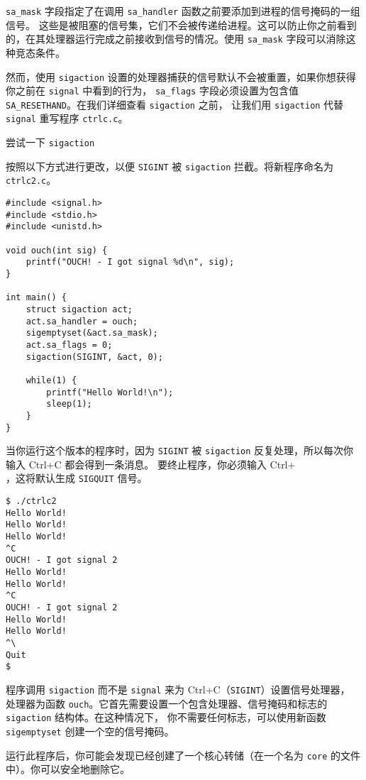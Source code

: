 \documentclass{ctexart}
\begin{document}
\texttt{sa\_mask} 字段指定了在调用 \texttt{sa\_handler} 函数之前要添加到进程的信号掩码的一组信号。
这些是被阻塞的信号集，它们不会被传递给进程。这可以防止你之前看到的，在其处理器运行完成之前接收到信号的情况。使用 \texttt{sa\_mask} 字段可以消除这种竞态条件。  
  
然而，使用 \texttt{sigaction} 设置的处理器捕获的信号默认不会被重置，如果你想获得你之前在 \texttt{signal} 中看到的行为，
\texttt{sa\_flags} 字段必须设置为包含值 \texttt{SA\_RESETHAND}。在我们详细查看 \texttt{sigaction} 之前，
让我们用 \texttt{sigaction} 代替 \texttt{signal} 重写程序 \texttt{ctrlc.c}。  

尝试一下 \texttt{sigaction}
  
按照以下方式进行更改，以便 \texttt{SIGINT} 被 \texttt{sigaction} 拦截。将新程序命名为 \texttt{ctrlc2.c}。  
  
\begin{verbatim}  
#include <signal.h>  
#include <stdio.h>  
#include <unistd.h>  
  
void ouch(int sig) {  
    printf("OUCH! - I got signal %d\n", sig);  
}  
  
int main() {  
    struct sigaction act;  
    act.sa_handler = ouch;  
    sigemptyset(&act.sa_mask);  
    act.sa_flags = 0;  
    sigaction(SIGINT, &act, 0);  
  
    while(1) {  
        printf("Hello World!\n");  
        sleep(1);  
    }  
}  
\end{verbatim}  

  
当你运行这个版本的程序时，因为 \texttt{SIGINT} 被 \texttt{sigaction} 反复处理，所以每次你输入 Ctrl+C 都会得到一条消息。
要终止程序，你必须输入 Ctrl+\\，这将默认生成 \texttt{SIGQUIT} 信号。  
  
\begin{verbatim}  
$ ./ctrlc2  
Hello World!  
Hello World!  
Hello World!  
^C  
OUCH! - I got signal 2  
Hello World!  
Hello World!  
^C  
OUCH! - I got signal 2  
Hello World!  
Hello World!  
^\  
Quit  
$  
\end{verbatim}  
    
程序调用 \texttt{sigaction} 而不是 \texttt{signal} 来为 Ctrl+C（\texttt{SIGINT}）设置信号处理器，
处理器为函数 \texttt{ouch}。它首先需要设置一个包含处理器、信号掩码和标志的 \texttt{sigaction} 结构体。在这种情况下，
你不需要任何标志，可以使用新函数 \texttt{sigemptyset} 创建一个空的信号掩码。  
  
运行此程序后，你可能会发现已经创建了一个核心转储（在一个名为 \texttt{core} 的文件中）。你可以安全地删除它。  
\end{document}
